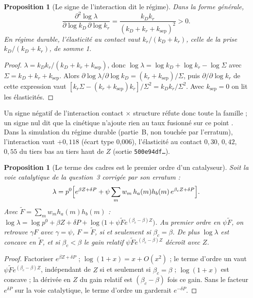 \documentclass[11pt,a4paper]{article}
\theoremstyle{definition}
\theoremstyle{plain}
\newtheorem{proposition}[definition]{Proposition}
\begin{document}
\begin{proposition}[Le signe de l'interaction dit le régime]
\label{prop:interaction}
Dans la forme générale,
\[ \frac{\partial^2\log\lambda}{\partial\log k_D\,\partial\log k_r}=\frac{k_Dk_r}{(k_D+k_r+k_{\mathrm{sep}})^2}>0 . \]
En régime durable, l'élasticité au contact vaut $k_r/(k_D+k_r)$, celle de la prise $k_D/(k_D+k_r)$,
de somme 1.
\end{proposition}
\begin{proof}
$\lambda=k_Dk_r/(k_D+k_r+k_{\mathrm{sep}})$, donc $\log\lambda=\log k_D+\log k_r-\log\Sigma$ avec
$\Sigma=k_D+k_r+k_{\mathrm{sep}}$. Alors $\partial\log\lambda/\partial\log k_D=(k_r+k_{\mathrm{sep}})/\Sigma$,
puis $\partial/\partial\log k_r$ de cette expression vaut
$[k_r\Sigma-(k_r+k_{\mathrm{sep}})k_r]/\Sigma^2=k_Dk_r/\Sigma^2$. Avec $k_{\mathrm{sep}}=0$ on lit les
élasticités.
\end{proof}
Un signe négatif de l'interaction contact $\times$ structure réfute donc toute la famille ; un signe
nul dit que la cinétique n'ajoute rien au taux fusionné sur ce point \cite[section~2]{q3}. Dans la
simulation du régime durable (partie~B, non touchée par l'erratum), l'interaction vaut $+0{,}118$
(écart type 0,006), l'élasticité au contact $0{,}30$, $0{,}42$, $0{,}55$ du tiers bas au tiers haut de
$Z$ \cite[section~2]{q3} (sortie \texttt{500e94df…}).

\begin{proposition}[Le terme des cadres est le premier ordre d'un catalyseur]
\label{prop:catalyseur}
Soit la voie catalytique de la question~3 corrigée par son erratum \cite[mineur~2]{erratumq3} :
\[ \lambda=p^0\Bigl[e^{\beta Z+\delta P}+\psi\sum_mw_m\,h_a(m)h_b(m)\,e^{\beta_cZ+\delta P}\Bigr]. \]
Avec $\tilde F=\sum_mw_mh_a(m)h_b(m)$ :
$\log\lambda=\log p^0+\beta Z+\delta P+\log\bigl(1+\psi\tilde F e^{(\beta_c-\beta)Z}\bigr)$. Au premier
ordre en $\psi\tilde F$, on retrouve $\gamma F$ avec $\gamma=\psi$, $F=\tilde F$, si et seulement si
$\beta_c=\beta$. De plus $\log\lambda$ est concave en $\tilde F$, et si $\beta_c<\beta$ le gain relatif
$\psi\tilde Fe^{(\beta_c-\beta)Z}$ décroît avec $Z$.
\end{proposition}
\begin{proof}
Factoriser $e^{\beta Z+\delta P}$ ; $\log(1+x)=x+O(x^2)$ ; le terme d'ordre un vaut
$\psi\tilde Fe^{(\beta_c-\beta)Z}$, indépendant de $Z$ si et seulement si $\beta_c=\beta$ ;
$\log(1+x)$ est concave ; la dérivée en $Z$ du gain relatif est $(\beta_c-\beta)$ fois ce gain.
Sans le facteur $e^{\delta P}$ sur la voie catalytique, le terme d'ordre un garderait $e^{-\delta P}$.
\end{proof}
\end{document}
